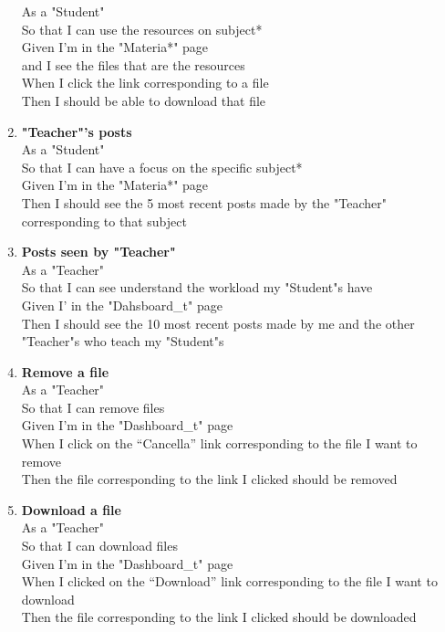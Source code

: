 \documentclass[Lau, binding=0.6cm]{sapthesis}
\begin{document}
\begin{enumerate}
			As a "Student"\\
			So that I can use the resources on subject*\\
			Given I’m in the "Materia*" page\\
			and I see the files that are the resources\\
			When I click the link corresponding to a file\\
			Then I should be able to download that file\\
	\item \textbf{"Teacher"’s posts}\\
			As a "Student"\\
			So that I can have a focus on the specific subject*\\
			Given I’m in the "Materia*" page\\
			Then I should see the 5 most recent posts made by the "Teacher" corresponding to that subject\\
	\item \textbf{Posts seen by "Teacher"}\\
			As a "Teacher"\\
			So that I can see understand the workload my "Student"s have\\
			Given I’ in the "Dahsboard\_t" page\\
			Then I should see the 10 most recent posts made by me and the other "Teacher"s who teach my "Student"s\\
	\item \textbf{Remove a file}\\
			As a "Teacher"\\
			So that I can remove files\\
			Given I’m in the "Dashboard\_t" page\\
			When I click on the “Cancella” link corresponding to the file I want to remove\\
			Then the file corresponding to the link I clicked should be removed\\
	\item \textbf{Download a file}\\
			As a "Teacher"\\
			So that I can download files\\
			Given I’m in the "Dashboard\_t" page\\
			When I clicked on the “Download” link corresponding to the file I want to download\\
			Then the file corresponding to the link I clicked should be downloaded\\

\end{enumerate}
\end{document}
